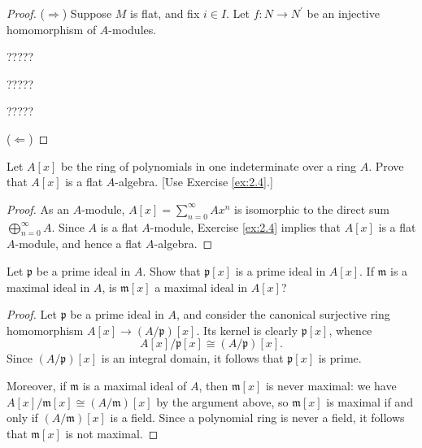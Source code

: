 \begin{proof}
($\Rightarrow$)
Suppose $M$ is flat, and fix $i \in I$.
Let $f : N \to N^\prime$ be an injective homomorphism of $A$-modules.



?????

?????

?????





($\Leftarrow$)


\end{proof}


\begin{exercise}
\label{ex:2.5}
Let $A[x]$ be the ring of polynomials in one indeterminate over a ring $A$.
Prove that $A[x]$ is a flat $A$-algebra.
[Use Exercise \ref{ex:2.4}.]
\end{exercise}

\begin{proof}
As an $A$-module, $A[x] = \sum_{n=0}^\infty A x^n$ is isomorphic to the direct sum $\bigoplus_{n=0}^\infty A$.
Since $A$ is a flat $A$-module, Exercise \ref{ex:2.4} implies that $A[x]$ is a flat $A$-module, and hence a flat $A$-algebra.
\end{proof}



\begin{exercise}
\label{ex:2.6}

\end{exercise}

\begin{exercise}
\label{ex:2.7}
Let $\mathfrak p$ be a prime ideal in $A$.
Show that $\mathfrak p[x]$ is a prime ideal in $A[x]$.
If $\mathfrak m$ is a maximal ideal in $A$, is $\mathfrak m[x]$ a maximal ideal in $A[x]$?
\end{exercise}

\begin{proof}
Let $\mathfrak p$ be a prime ideal in $A$, and consider the canonical surjective ring homomorphism $A[x] \to (A/\mathfrak p)[x]$.
Its kernel is clearly $\mathfrak p[x]$, whence
\begin{equation*}
A[x] / \mathfrak p[x] \cong (A / \mathfrak p)[x].
\end{equation*}
Since $(A/\mathfrak p)[x]$ is an integral domain, it follows that $\mathfrak p[x]$ is prime.

Moreover, if $\mathfrak m$ is a maximal ideal of $A$, then $\mathfrak m[x]$ is never maximal: we have $A[x] / \mathfrak m[x] \cong (A/\mathfrak m)[x]$ by the argument above, so $\mathfrak m[x]$ is maximal if and only if $(A/\mathfrak m)[x]$ is a field.
Since a polynomial ring is never a field, it follows that $\mathfrak m[x]$ is not maximal.
\end{proof}



